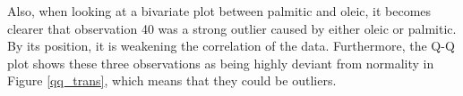 Also, when looking at a bivariate plot between palmitic and oleic, it becomes clearer that observation 40 was a strong outlier caused by either oleic or palmitic. By its position, it is weakening the correlation of the data. Furthermore, the Q-Q plot shows these three observations as being highly deviant from normality in Figure \ref{qq_trans}, which means that they could be outliers.

